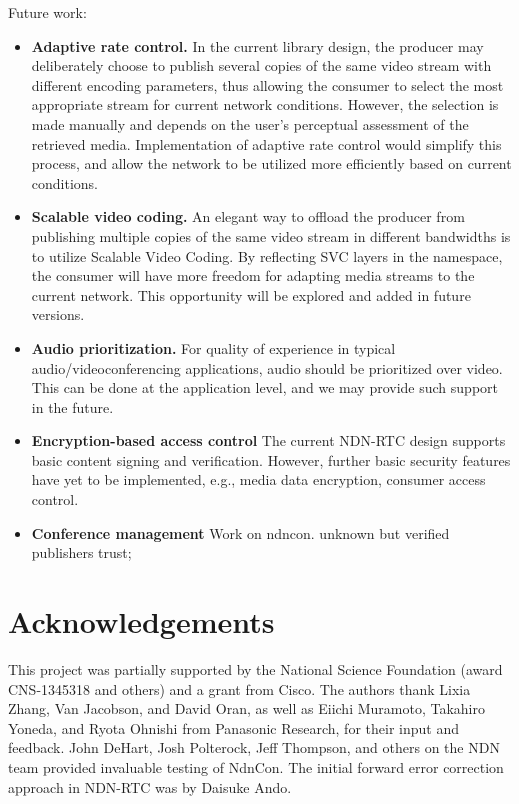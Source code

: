 \documentclass{icn/sig-alternate-2012} %
\newcommand{\ndnrtcName}{NDN-RTC} %
\newcommand{\ndnconName}{NdnCon}
\begin{document}
Future work: 
\begin{itemize}[label={}]
\item \textbf{Adaptive rate control.} In the current library design, the producer may deliberately choose to publish several copies of the same video stream with different encoding parameters, thus allowing the consumer to select the most appropriate stream for current network conditions. However, the selection is made manually and depends on the user's perceptual assessment of the retrieved media. Implementation of adaptive rate control would simplify this process, and allow the network to be utilized more efficiently based on current conditions.

\item \textbf{Scalable video coding.} An elegant way to offload the producer from publishing multiple copies of the same video stream in different bandwidths is to utilize Scalable Video Coding. By reflecting SVC layers in the namespace, the consumer will have more freedom for adapting media streams to the current network. This opportunity will be explored and added in future versions.

\item \textbf{Audio prioritization.}  For quality of experience in typical audio/videoconferencing applications, audio should be prioritized over video.  This can be done at the application level, and we may provide such support in the future. %

\item \textbf{Encryption-based access control} The current \ndnrtcName{} design supports basic content signing and verification. However, further basic security features have yet to be implemented, e.g., media data encryption, consumer access control.

\item \textbf{Conference management} 
Work on ndncon. unknown but verified publishers trust; 
\end{itemize}


\section{Acknowledgements}
\label{sec:Acknowledgements}
This project was partially supported by the National Science Foundation (award CNS-1345318 and others) and a grant from Cisco. The authors thank Lixia Zhang, Van Jacobson, and David Oran, as well as Eiichi Muramoto, Takahiro Yoneda, and Ryota Ohnishi from Panasonic Research, for their input and feedback. John DeHart, Josh Polterock, Jeff Thompson, and others on the NDN team provided invaluable testing of \ndnconName{}.  The initial forward error correction approach in \ndnrtcName{} was by Daisuke Ando. 



\end{document}
